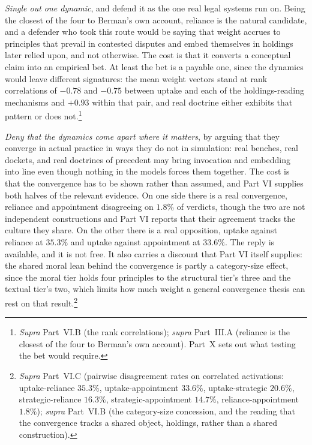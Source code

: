 \textit{Single out one dynamic}, and defend it as the one real legal
systems run on. Being the closest of the four to Berman's own account, reliance is the
natural candidate, and a defender who took this route would be saying that
weight accrues to principles that prevail in contested disputes and embed
themselves in holdings later relied upon, and not otherwise. The cost is
that it converts a conceptual claim into an empirical bet. At least the bet is a payable one, since the dynamics would leave different
signatures: the mean weight vectors stand at rank
correlations of $-0.78$ and $-0.75$ between uptake and each of the
holdings-reading mechanisms and $+0.93$ within that pair, and real
doctrine either exhibits that pattern or does not.\footnote{\textit{Supra}
Part~VI.B (the rank correlations); \textit{supra} Part~III.A (reliance is
the closest of the four to Berman's own account). Part~X sets out what
testing the bet would require.}

\textit{Deny that the dynamics come apart where it matters}, by arguing
that they converge in actual practice in ways they do not in simulation:
real benches, real dockets, and real doctrines of precedent may bring
invocation and embedding into line even though nothing in the models
forces them together. The cost is that the convergence has to be shown rather than assumed, and
Part VI supplies both halves of the relevant evidence. On one side there is a real convergence, reliance and appointment disagreeing
on $1.8\%$ of verdicts, though the two are not independent constructions and
Part VI reports that their agreement tracks the culture they share. On the
other there is a real opposition, uptake against reliance at $35.3\%$ and
uptake against appointment at $33.6\%$. The reply is available, and it is not free. It also carries a discount that
Part VI itself supplies: the shared moral lean behind the convergence is partly a
category-size effect, since the moral tier holds four principles to the
structural tier's three and the textual tier's two, which limits how much
weight a general convergence thesis can rest on that
result.\footnote{\textit{Supra} Part~VI.C (pairwise disagreement rates on
correlated activations: uptake-reliance $35.3\%$, uptake-appointment
$33.6\%$, uptake-strategic $20.6\%$, strategic-reliance $16.3\%$,
strategic-appointment $14.7\%$, reliance-appointment $1.8\%$);
\textit{supra} Part~VI.B (the category-size concession, and the reading
that the convergence tracks a shared object, holdings, rather than a
shared construction).}

